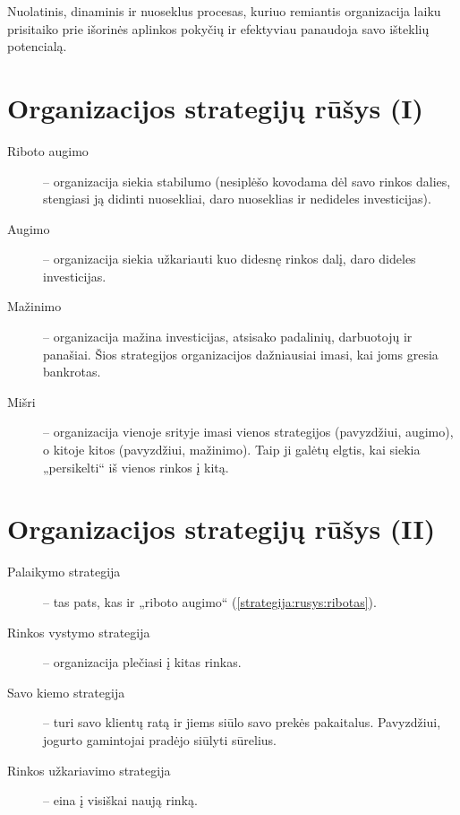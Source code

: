 \begin{defn}
  Nuolatinis, dinaminis ir nuoseklus procesas, kuriuo remiantis
  organizacija laiku prisitaiko prie išorinės aplinkos pokyčių ir
  efektyviau panaudoja savo išteklių potencialą.
\end{defn}

\section{Organizacijos strategijų rūšys (I)}

\begin{description}
  \item[Riboto augimo] \label{strategija:rusys:ribotas} – organizacija
    siekia stabilumo (nesiplėšo kovodama dėl savo rinkos dalies,
    stengiasi ją didinti nuosekliai, daro nuoseklias ir nedideles
    investicijas).
  \item[Augimo] – organizacija siekia užkariauti kuo didesnę rinkos
    dalį, daro dideles investicijas.
  \item[Mažinimo] – organizacija mažina investicijas, atsisako padalinių,
    darbuotojų ir panašiai. Šios strategijos organizacijos dažniausiai
    imasi, kai joms gresia bankrotas.
  \item[Mišri] – organizacija vienoje srityje imasi vienos strategijos
    (pavyzdžiui, augimo), o kitoje kitos (pavyzdžiui, mažinimo). Taip
    ji galėtų elgtis, kai siekia „persikelti“ iš vienos rinkos į kitą.
\end{description}

\section{Organizacijos strategijų rūšys (II)}

\begin{description}
  \item[Palaikymo strategija] – tas pats, kas ir „riboto augimo“
    (\ref{strategija:rusys:ribotas}).
  \item[Rinkos vystymo strategija] – organizacija plečiasi į kitas
    rinkas. %
  \item[Savo kiemo strategija] – turi savo klientų ratą ir jiems
    siūlo savo prekės pakaitalus. Pavyzdžiui, jogurto gamintojai
    pradėjo siūlyti sūrelius. %
  \item[Rinkos užkariavimo strategija] – eina į visiškai naują rinką.
\end{description}

